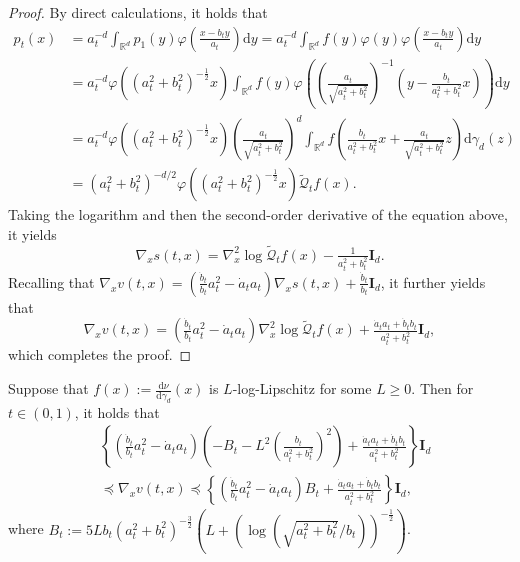 \documentclass[twoside,11pt]{article}
\def\rmI{{\mathbf{I}}}
\def\sR{{\mathbb{R}}}
\newcommand{\diff}{\mathrm{d}}
\numberwithin{equation}{section}
\begin{document}
\begin{proof}
By direct calculations, it holds that
\begin{align*}
    p_t(x)
    &= a_t^{-d} \int_{\sR^d} p_1(y) \varphi \left( \frac{x-b_t y}{a_t} \right) \diff y
     = a_t^{-d} \int_{\sR^d} f(y) \varphi(y) \varphi \left( \frac{x-b_t y}{a_t} \right) \diff y \\
    &= a_t^{-d} \varphi \left( (a_t^2 + b_t^2)^{-\frac12} x \right) \int_{\sR^d} f(y) \varphi \left( \left( \frac{a_t}{\sqrt{a_t^2 + b_t^2}} \right)^{-1} \left( y - \frac{b_t}{a_t^2 + b_t^2} x \right) \right) \diff y \\
    &= a_t^{-d} \varphi \left( (a_t^2 + b_t^2)^{-\frac12} x \right) \left(\frac{a_t}{\sqrt{a_t^2 + b_t^2}}\right)^d \int_{\sR^d} f \left( \frac{b_t}{a_t^2 + b_t^2} x + \frac{a_t}{\sqrt{a_t^2 + b_t^2}} z \right) \diff \gamma_d(z) \\
    &= (a_t^2 + b_t^2)^{-d/2} \varphi \left( (a_t^2 + b_t^2)^{-\frac12} x \right) \widetilde{\mathcal{Q}}_t f(x).
\end{align*}
Taking the logarithm and then the second-order derivative of the equation above, it yields
\begin{equation*}
     \nabla_x s(t, x) = \nabla^2_x \log \widetilde{\mathcal{Q}}_t f(x) - \tfrac{1}{a_t^2 + b_t^2} \rmI_d.
\end{equation*}
Recalling that $\nabla_x v(t, x) = \left( \frac{\dot{b}_t}{b_t} a_t^2 - \dot{a}_t a_t \right) \nabla_x s(t, x) + \frac{\dot{b}_t}{b_t} \rmI_d$, it further yields that
\begin{equation*}
    \nabla_x v(t, x) = \left( \tfrac{\dot{b}_t}{b_t} a_t^2 - \dot{a}_t a_t \right) \nabla^2_x \log \widetilde{\mathcal{Q}}_t f(x) + \tfrac{\dot{a}_t a_t + \dot{b}_t b_t}{a_t^2 + b_t^2} \rmI_d,
\end{equation*}
which completes the proof.
\end{proof}

\begin{corollary} \label{cor:bd-vf-log-Lip}
Suppose that $f(x) := \frac{\diff \nu}{\diff \gamma_d}(x)$ is $L$-log-Lipschitz for some $L \ge 0$. Then for $t \in (0, 1)$, it holds that
\begin{align*}
    & \left\{ \left( \tfrac{\dot{b}_t}{b_t} a_t^2 - \dot{a}_t a_t \right) \left( -B_t - L^2 \left( \tfrac{b_t}{a_t^2 + b_t^2} \right)^2 \right) + \tfrac{\dot{a}_t a_t + \dot{b}_t b_t}{a_t^2 + b_t^2} \right\} \rmI_d \\
    & \preceq \nabla_x v(t, x)
    \preceq \left\{ \left( \tfrac{\dot{b}_t}{b_t} a_t^2 - \dot{a}_t a_t \right) B_t + \tfrac{\dot{a}_t a_t + \dot{b}_t b_t}{a_t^2 + b_t^2} \right\} \rmI_d,
\end{align*}
where $B_t := 5L b_t (a_t^2 + b_t^2)^{-\frac32} (L + (\log (\sqrt{a_t^2 + b_t^2}/b_t))^{-\frac12})$.
\end{corollary}
\end{document}
